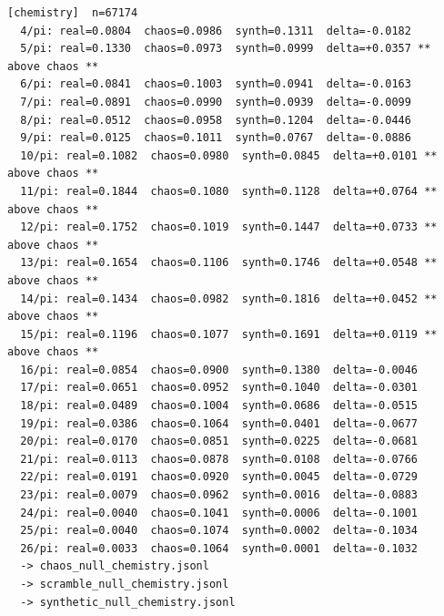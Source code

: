 \documentclass[11pt, letterpaper, openany]{book}
\begin{document}
\begin{empiricalbox}
\begin{lstlisting}[style=terminal]
[chemistry]  n=67174
  4/pi: real=0.0804  chaos=0.0986  synth=0.1311  delta=-0.0182
  5/pi: real=0.1330  chaos=0.0973  synth=0.0999  delta=+0.0357 ** above chaos **
  6/pi: real=0.0841  chaos=0.1003  synth=0.0941  delta=-0.0163
  7/pi: real=0.0891  chaos=0.0990  synth=0.0939  delta=-0.0099
  8/pi: real=0.0512  chaos=0.0958  synth=0.1204  delta=-0.0446
  9/pi: real=0.0125  chaos=0.1011  synth=0.0767  delta=-0.0886
  10/pi: real=0.1082  chaos=0.0980  synth=0.0845  delta=+0.0101 ** above chaos **
  11/pi: real=0.1844  chaos=0.1080  synth=0.1128  delta=+0.0764 ** above chaos **
  12/pi: real=0.1752  chaos=0.1019  synth=0.1447  delta=+0.0733 ** above chaos **
  13/pi: real=0.1654  chaos=0.1106  synth=0.1746  delta=+0.0548 ** above chaos **
  14/pi: real=0.1434  chaos=0.0982  synth=0.1816  delta=+0.0452 ** above chaos **
  15/pi: real=0.1196  chaos=0.1077  synth=0.1691  delta=+0.0119 ** above chaos **
  16/pi: real=0.0854  chaos=0.0900  synth=0.1380  delta=-0.0046
  17/pi: real=0.0651  chaos=0.0952  synth=0.1040  delta=-0.0301
  18/pi: real=0.0489  chaos=0.1004  synth=0.0686  delta=-0.0515
  19/pi: real=0.0386  chaos=0.1064  synth=0.0401  delta=-0.0677
  20/pi: real=0.0170  chaos=0.0851  synth=0.0225  delta=-0.0681
  21/pi: real=0.0113  chaos=0.0878  synth=0.0108  delta=-0.0766
  22/pi: real=0.0191  chaos=0.0920  synth=0.0045  delta=-0.0729
  23/pi: real=0.0079  chaos=0.0962  synth=0.0016  delta=-0.0883
  24/pi: real=0.0040  chaos=0.1041  synth=0.0006  delta=-0.1001
  25/pi: real=0.0040  chaos=0.1074  synth=0.0002  delta=-0.1034
  26/pi: real=0.0033  chaos=0.1064  synth=0.0001  delta=-0.1032
  -> chaos_null_chemistry.jsonl
  -> scramble_null_chemistry.jsonl
  -> synthetic_null_chemistry.jsonl


\end{lstlisting}
\end{empiricalbox}
\end{document}
